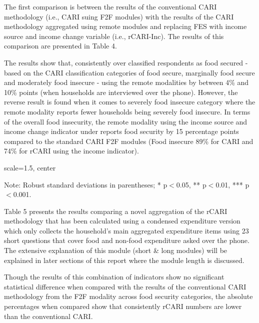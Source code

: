\documentclass[11pt,harvard]{article}
\begin{document}
	The first comparison is between the results of the conventional CARI methodology (i.e., CARI suing F2F modules) with the results of the CARI methodology aggregated using remote modules and replacing FES with income source and income change variable (i.e., rCARI-Inc). The results of this comparison are presented in Table 4.
	
	The results show that, consistently over classified  respondents as food secured - based on the CARI classification categories of food secure, marginally food secure and moderately food insecure - using the remote modalities by between 4\% and 10\% points (when households are interviewed over the phone). However, the reverse result is found when it comes to severely food insecure category where the remote modality reports fewer households being severely food insecure. In terms of the overall food insecurity, the remote modality using the income source and income change indicator under reports food security by 15 percentage points compared to the standard CARI F2F modules (Food insecure 89\% for CARI and 74\% for rCARI using the income indicator).  
	
	\begin{table}[htbp]
		\centering
		\begin{adjustbox}{scale=1.5, center} %
			\begin{threeparttable}
				\caption{Impact of Survey Modality: Standard CARI-FES vs. Standard rCARI-Inc}
				\scriptsize
				 
				\label{tab:CARI_rCARI_Modality_BF}
				\begin{tablenotes}
					\item Note: Robust standard deviations in parentheses; * p$<$0.05, ** p$<$0.01, *** p$<$0.001. 
				\end{tablenotes}
			\end{threeparttable}
		\end{adjustbox}
	\end{table}
	
	Table 5 presents the results comparing a novel aggregation of the rCARI methodology that has been calculated using a condensed expenditure version which only collects the household's main aggregated expenditure items using 23 short questions that cover food and non-food expenditure asked over the phone. The extensive explanation of this module (short \& long modules) will be explained in later sections of this report where the module length is discussed. 
	
	Though the results of this combination of indicators show no significant statistical difference when compared with the results of the conventional CARI methodology from the F2F modality across food security categories, the absolute percentages when compared show that consistently rCARI numbers are lower than the conventional CARI.
\end{document}
